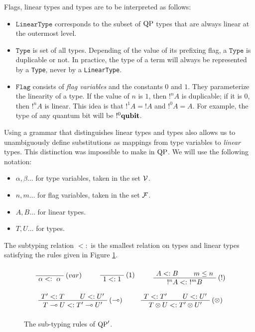 Flags, linear types and types are to be interpreted as follows:
\begin{itemize}
	\item $\texttt{LinearType}$ corresponds to the subset of ${\rm QP}$ types that are always linear at the outermost level.
	\item $\texttt{Type}$ is set of all types. Depending of the value of its prefixing flag, a $\texttt{Type}$ is duplicable or not.
		In practice, the type of a term will always be represented by a \texttt{Type}, never by a \texttt{LinearType}.
	\item $\texttt{Flag}$ consists of \textit{flag variables} and the constants $0$ and $1$. They parameterize the linearity of a type.
		If the value of $n$ is $1$, then $!^n A$ is duplicable; if it is $0$, then $!^n A$ is linear. This idea is that $!^1A=!A$ and $!^0A=A$. For example, the type
		of any quantum bit will be $!^0 \textrm{\bf qubit}$.
\end{itemize}
Using a grammar that distinguishes linear types and types also allows us to unambiguously define substitutions as mappings from type variables to \textit{linear} types. This distinction was impossible to make in ${\rm QP}$. We will use the following notation:
\begin{itemize}
	\item $\alpha, \beta \dots$ for type variables, taken in the set $\mathcal{V}$.
	\item $n, m \dots$ for flag variables, taken in the set $\mathcal{F}$.
	\item $A, B \dots$ for linear types.
	\item $T, U \dots$ for types.
\end{itemize}

\begin{defn} The subtyping relation $<:$ is the smallest relation on types and linear types satisfying the rules given in Figure \ref{subtypingQP'}.
\end{defn}

\begin{figure}[!ht]
\begin{mdframed}
	$$ $$
	$$ \mbox{
  	\AxiomC{}
  	\RightLabel{$(var)$}
	 	\UnaryInfC{$\alpha <: ~ \alpha$}
	 	\DisplayProof
		~~
		~~
		\AxiomC{}
	 	\RightLabel{$(1)$}
	 	\UnaryInfC{$1 <: 1$}
		\DisplayProof
		~~
		~~
	 	\AxiomC{$A <: B$}
	 	\AxiomC{$m \le n$}
	 	\RightLabel{$(!)$}
	 	\BinaryInfC{$!^n A <: ~ !^m B$}
		\DisplayProof
	} $$
	$$ $$
	$$ \mbox{
	 	\AxiomC{$T' <: T$}
	 	\AxiomC{$U <: U'$}
	 	\RightLabel{$(\multimap)$}
	 	\BinaryInfC{$T \multimap U <: T' \multimap U'$}
		\DisplayProof
		~~
		~~
	 	\AxiomC{$T <: T'$}
	 	\AxiomC{$U <: U'$}
	 	\RightLabel{$(\otimes)$}
	 	\BinaryInfC{$T \otimes U <: T' \otimes U'$}
		\DisplayProof
	} $$
	$$ $$
\end{mdframed}
\caption{The sub-typing rules of ${\rm QP}'$.}
\label{subtypingQP'}
\end{figure}

